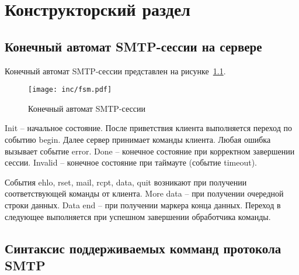 \chapter{Конструкторский раздел}
\label{cha:design}

\section{Конечный автомат SMTP-сессии на сервере}

Конечный автомат SMTP-сессии представлен на рисунке~\ref{fig:fsm}.

\begin{figure}
\centering
\texttt{[image: inc/fsm.pdf]}
\caption{Конечный автомат SMTP-сессии}
\label{fig:fsm}
\end{figure}

Init -- начальное состояние.
После приветствия клиента выполняется переход по событию begin.
Далее сервер принимает команды клиента.
Любая ошибка вызывает событие error.
Done -- конечное состояние при корректном завершении сессии.
Invalid -- конечное состояние при таймауте (событие timeout).

События ehlo, rset, mail, rcpt, data, quit возникают при получении соответствующей команды от клиента.
More data -- при получении очередной строки данных.
Data end -- при получении маркера конца данных.
Переход в следующее выполняется при успешном завершении обработчика команды.

\section{Синтаксис поддерживаемых комманд протокола SMTP}


